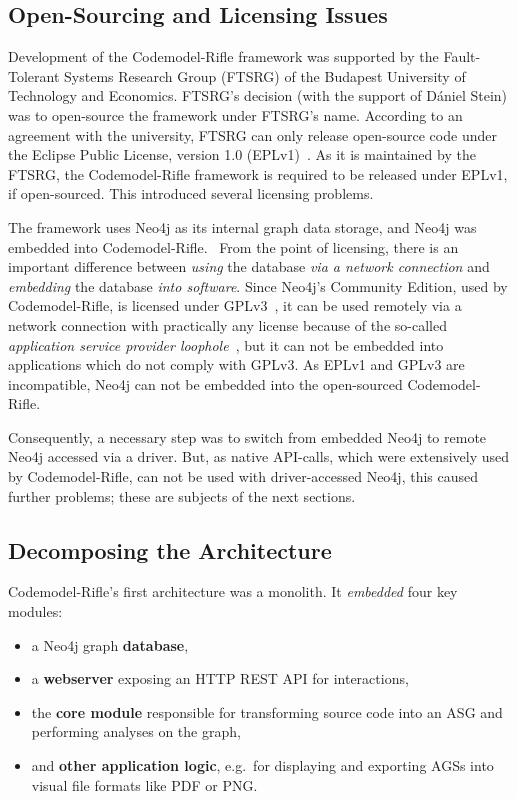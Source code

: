 \subsection{Open-Sourcing and Licensing Issues}

Development of the Codemodel-Rifle framework was supported by the Fault-Tolerant Systems Research Group (FTSRG) of the Budapest University of Technology and Economics. FTSRG's decision (with the support of Dániel Stein) was to open-source the framework under FTSRG's name. According to an agreement with the university, FTSRG can only release open-source code under the Eclipse Public License, version 1.0 (EPLv1)~\cite{eplv1}. As it is maintained by the FTSRG, the Codemodel-Rifle framework is required to be released under EPLv1, if open-sourced. This introduced several licensing problems.~\cite{codemodel-rifle-licensing}

The framework uses Neo4j as its internal graph data storage, and Neo4j was embedded into Codemodel-Rifle.~\cite{stein-daniel-msc} From the point of licensing, there is an important difference between \emph{using} the database \emph{via a network connection} and \emph{embedding} the database \emph{into software}. Since Neo4j's Community Edition, used by Codemodel-Rifle, is licensed under GPLv3~\cite{neo4j-licensing}, it can be used remotely via a network connection with practically any license because of the so-called \emph{application service provider loophole}~\cite{asp-loophole}, but it can not be embedded into applications which do not comply with GPLv3. As EPLv1 and GPLv3 are incompatible, Neo4j can not be embedded into the open-sourced Codemodel-Rifle.

Consequently, a necessary step was to switch from embedded Neo4j to remote Neo4j accessed via a driver. But, as native API-calls, which were extensively used by Codemodel-Rifle, can not be used with driver-accessed Neo4j, this caused further problems; these are subjects of the next sections.


\subsection{Decomposing the Architecture}

Codemodel-Rifle's first architecture was a monolith. It \emph{embedded} four key modules:

\begin{itemize}
\item a Neo4j graph \textbf{database},
\item a \textbf{webserver} exposing an HTTP REST API for interactions,
\item the \textbf{core module} responsible for transforming source code into an ASG and performing analyses on the graph,
\item and \textbf{other application logic}, e.g.\ for displaying and exporting AGSs into visual file formats like PDF or PNG.
\end{itemize}

